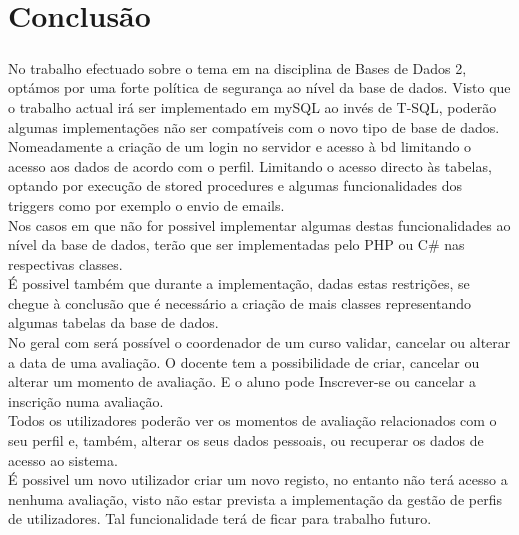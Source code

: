 

\chapter{Conclusão}

\paragraph{}

No trabalho efectuado sobre o tema em na disciplina de Bases de Dados 2, optámos por uma forte política de segurança ao nível da base de dados. Visto que o trabalho actual irá ser implementado em mySQL ao invés de T-SQL, poderão algumas implementações não ser compatíveis com o novo tipo de base de dados. Nomeadamente a criação de um login no servidor e acesso à bd limitando o acesso aos dados de acordo com o perfil. Limitando o acesso directo às tabelas, optando por execução de stored procedures e algumas funcionalidades dos triggers como por exemplo o envio de emails.\\
Nos casos em que não for possivel implementar algumas destas funcionalidades ao nível da base de dados, terão que ser implementadas pelo PHP ou C\# nas respectivas classes.\\
É possivel também que durante a implementação, dadas estas restrições, se chegue à conclusão que é necessário a criação de mais classes representando algumas tabelas da base de dados.\\

No geral com será possível o coordenador de um curso validar, cancelar ou alterar a data de uma avaliação. O docente tem a possibilidade de criar, cancelar ou alterar um momento de avaliação. E o aluno pode Inscrever-se ou cancelar a inscrição numa avaliação.\\
Todos os utilizadores poderão ver os momentos de avaliação relacionados com o seu perfil e, também, alterar os seus dados pessoais, ou recuperar os dados de acesso ao sistema.\\
É possivel um novo utilizador criar um novo registo, no entanto não terá acesso a nenhuma avaliação, visto não estar prevista a implementação da gestão de perfis de utilizadores. Tal funcionalidade terá de ficar para trabalho futuro.